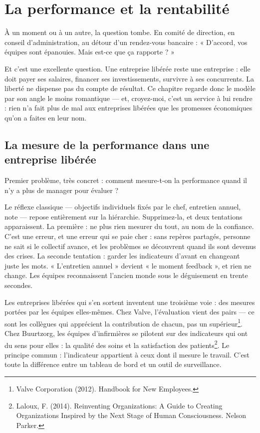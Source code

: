 
\chapter{La performance et la rentabilité}

\lettrine[lines=2]{À}{} un moment ou à un autre, la question tombe. En comité de direction, en conseil d'administration, au détour d'un rendez-vous bancaire : « D'accord, vos équipes sont épanouies. Mais est-ce que ça rapporte ? »

Et c'est une excellente question. Une entreprise libérée reste une entreprise : elle doit payer ses salaires, financer ses investissements, survivre à ses concurrents. La liberté ne dispense pas du compte de résultat. Ce chapitre regarde donc le modèle par son angle le moins romantique — et, croyez-moi, c'est un service à lui rendre : rien n'a fait plus de mal aux entreprises libérées que les promesses économiques qu'on a faites en leur nom.

\section{La mesure de la performance dans une entreprise libérée}

Premier problème, très concret : comment mesure-t-on la performance quand il n'y a plus de manager pour évaluer ?

Le réflexe classique — objectifs individuels fixés par le chef, entretien annuel, note — repose entièrement sur la hiérarchie. Supprimez-la, et deux tentations apparaissent. La première : ne plus rien mesurer du tout, au nom de la confiance. C'est une erreur, et une erreur qui se paie cher : sans repères partagés, personne ne sait si le collectif avance, et les problèmes se découvrent quand ils sont devenus des crises. La seconde tentation : garder les indicateurs d'avant en changeant juste les mots. « L'entretien annuel » devient « le moment feedback », et rien ne change. Les équipes reconnaissent l'ancien monde sous le déguisement en trente secondes.

Les entreprises libérées qui s'en sortent inventent une troisième voie : des mesures portées par les équipes elles-mêmes. Chez Valve, l'évaluation vient des pairs — ce sont les collègues qui apprécient la contribution de chacun, pas un supérieur\footnote{Valve Corporation (2012). Handbook for New Employees.}. Chez Buurtzorg, les équipes d'infirmières se pilotent sur des indicateurs qui ont du sens pour elles : la qualité des soins et la satisfaction des patients\footnote{Laloux, F. (2014). Reinventing Organizations: A Guide to Creating Organizations Inspired by the Next Stage of Human Consciousness. Nelson Parker.}. Le principe commun : l'indicateur appartient à ceux dont il mesure le travail. C'est toute la différence entre un tableau de bord et un outil de surveillance.

